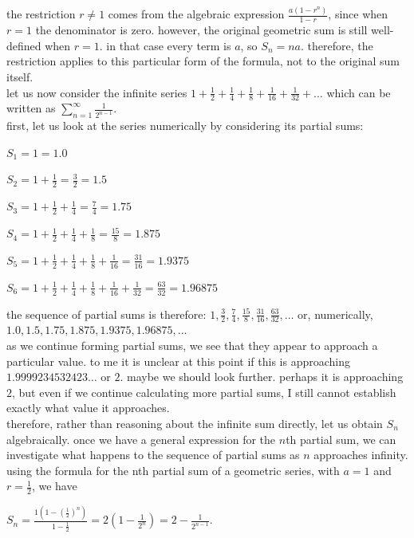 \documentclass{article}
\begin{document}
the restriction $r\neq1$ comes from the algebraic expression $\frac{a(1-r^n)}{1-r}$, since when $r=1$ the denominator is zero. however, the original geometric sum is still well-defined when $r=1$. in that case every term is $a$, so $S_n=na$. therefore, the restriction applies to this particular form of the formula, not to the original sum itself.\\

let us now consider the infinite series $1+\frac{1}{2}+\frac{1}{4}+\frac{1}{8}+\frac{1}{16}+\frac{1}{32}+\ldots$ which can be written as $\sum_{n=1}^{\infty}\frac{1}{2^{n-1}}$.\\

first, let us look at the series numerically by considering its partial sums:

$S_1=1=1.0$

$S_2=1+\frac{1}{2}=\frac{3}{2}=1.5$

$S_3=1+\frac{1}{2}+\frac{1}{4}=\frac{7}{4}=1.75$

$S_4=1+\frac{1}{2}+\frac{1}{4}+\frac{1}{8}=\frac{15}{8}=1.875$

$S_5=1+\frac{1}{2}+\frac{1}{4}+\frac{1}{8}+\frac{1}{16}=\frac{31}{16}=1.9375$

$S_6=1+\frac{1}{2}+\frac{1}{4}+\frac{1}{8}+\frac{1}{16}+\frac{1}{32}=\frac{63}{32}=1.96875$

the sequence of partial sums is therefore: $1,\frac{3}{2},\frac{7}{4},\frac{15}{8},\frac{31}{16},\frac{63}{32},\ldots$ or, numerically, $1.0,1.5,1.75,1.875,1.9375,1.96875,\ldots$\\

as we continue forming partial sums, we see that they appear to approach a particular value. to me it is unclear at this point if this is approaching $1.9999234532423\ldots$ or $2$. maybe we should look further. perhaps it is approaching $2$, but even if we continue calculating more partial sums, I still cannot establish exactly what value it approaches.\\

therefore, rather than reasoning about the infinite sum directly, let us obtain $S_n$ algebraically. once we have a general expression for the $n$th partial sum, we can investigate what happens to the sequence of partial sums as $n$ approaches infinity.\\

using the formula for the nth partial sum of a geometric series, with $a=1$ and $r=\frac{1}{2}$, we have

$S_n=\frac{1(1-(\frac{1}{2})^n)}{1-\frac{1}{2}}=2\left(1-\frac{1}{2^n}\right)=2-\frac{1}{2^{n-1}}$.\\
\end{document}
